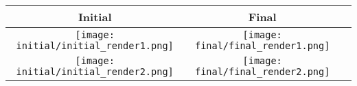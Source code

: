 \documentclass[12pt,tikz]{report}
\begin{document}
\begin{center}
\begin{tabular}{|c|c|c|}
\hline Initial & Final \\ 
%
%
%
%
\hline \texttt{[image: initial/initial\_render1.png]}
& 
\texttt{[image: final/final\_render1.png]}
\\ 
\hline 
\texttt{[image: initial/initial\_render2.png]} 
&  
\texttt{[image: final/final\_render2.png]}
\\
\hline
\end{tabular}
\end{center}
$ $
\\

\end{document}
